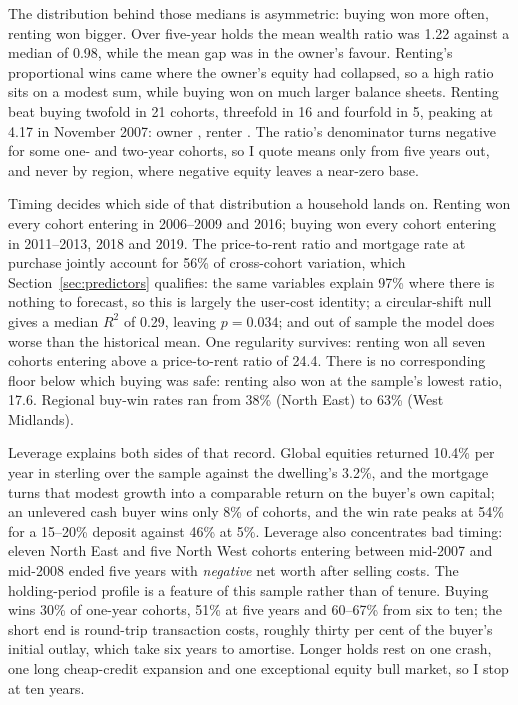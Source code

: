 The distribution behind those medians is asymmetric: buying won more often, renting won bigger. Over five-year holds the mean wealth ratio was 1.22 against a median of 0.98, while the mean gap was  in the owner's favour. Renting's proportional wins came where the owner's equity had collapsed, so a high ratio sits on a modest sum, while buying won on much larger balance sheets. Renting beat buying twofold in 21 cohorts, threefold in 16 and fourfold in 5, peaking at 4.17 in November 2007: owner , renter . The ratio's denominator turns negative for some one- and two-year cohorts, so I quote means only from five years out, and never by region, where negative equity leaves a near-zero base.

Timing decides which side of that distribution a household lands on. Renting won every cohort entering in 2006--2009 and 2016; buying won every cohort entering in 2011--2013, 2018 and 2019. The price-to-rent ratio and mortgage rate at purchase jointly account for 56\% of cross-cohort variation, which Section~\ref{sec:predictors} qualifies: the same variables explain 97\% where there is nothing to forecast, so this is largely the user-cost identity; a circular-shift null gives a median $R^2$ of 0.29, leaving $p = 0.034$; and out of sample the model does worse than the historical mean. One regularity survives: renting won all seven cohorts entering above a price-to-rent ratio of 24.4. There is no corresponding floor below which buying was safe: renting also won at the sample's lowest ratio, 17.6. Regional buy-win rates ran from 38\% (North East) to 63\% (West Midlands).

Leverage explains both sides of that record. Global equities returned 10.4\% per year in sterling over the sample against the dwelling's 3.2\%, and the mortgage turns that modest growth into a comparable return on the buyer's own capital; an unlevered cash buyer wins only 8\% of cohorts, and the win rate peaks at 54\% for a 15--20\% deposit against 46\% at 5\%. Leverage also concentrates bad timing: eleven North East and five North West cohorts entering between mid-2007 and mid-2008 ended five years with \emph{negative} net worth after selling costs. The holding-period profile is a feature of this sample rather than of tenure. Buying wins 30\% of one-year cohorts, 51\% at five years and 60--67\% from six to ten; the short end is round-trip transaction costs, roughly thirty per cent of the buyer's initial outlay, which take six years to amortise. Longer holds rest on one crash, one long cheap-credit expansion and one exceptional equity bull market, so I stop at ten years.

